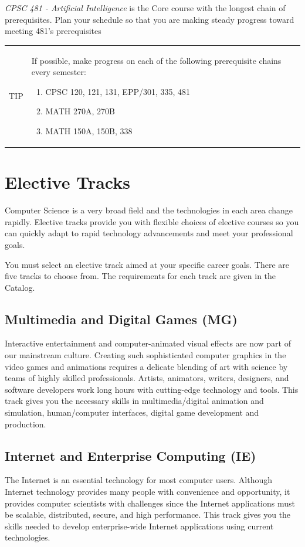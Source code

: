 \documentclass{book}
\newenvironment{tip}
               {\tcolorbox \begin{tabular}{m{.5in} m{5in}} \Large{TIP} & }
               {\end{tabular} \endtcolorbox}
\begin{document}
\emph{CPSC 481 - Artificial Intelligence} is the Core course with the longest chain of prerequisites. Plan your schedule so that you are making steady progress toward meeting 481's prerequisites

\begin{tip}
  If possible, make progress on each of the following prerequisite chains every semester:
  \begin{enumerate}
  \item CPSC 120, 121, 131, EPP/301, 335, 481
  \item MATH 270A, 270B
  \item MATH 150A, 150B, 338
  \end{enumerate}
\end{tip}

\section{Elective Tracks}
 
Computer Science is a very broad field and the technologies in each area change rapidly. Elective tracks provide you with flexible choices of elective courses so you can quickly adapt to rapid technology advancements and meet your professional goals.

You must select an elective track aimed at your specific career goals. There are five tracks to choose from. The requirements for each track are given in the Catalog.

\subsection{Multimedia and Digital Games (MG)}
Interactive entertainment and computer-animated visual effects are now part of our mainstream culture. Creating such sophisticated computer graphics in the video games and animations requires a delicate blending of art with science by teams of highly skilled professionals. Artists, animators, writers, designers, and software developers work long hours with cutting-edge technology and tools. This track gives you the necessary skills in multimedia/digital animation and simulation, human/computer interfaces, digital game development and production.

\subsection{Internet and Enterprise Computing (IE)}
The Internet is an essential technology for most computer users. Although Internet technology provides many people with convenience and opportunity, it provides computer scientists with challenges since the Internet applications must be scalable, distributed, secure, and high performance. This track gives you the skills needed to develop enterprise-wide Internet applications using current technologies.
\end{document}
